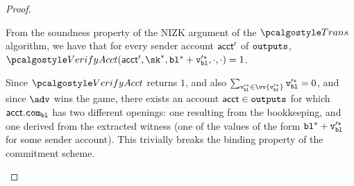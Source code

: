 \begin{proof}
\begin{itemize}
    From the soundness property of the NIZK argument of the $\trans$ algorithm, we have that for every sender account $\textup{\textsf{acct}}^\prime$ of ${\textup{\texttt{outputs}}}$, $\veract(\acct^\prime, \sk^*, \varbl^* + \vbl^{\prime *}, \cdot, \cdot)=1$.

    Since $\veract$ returns $1$, and also $\sum_{\vbl^{\prime *} \in \vv{\vbl^{\prime *}}} \vbl^{\prime *} = 0$, and since $\adv$ wins the game, there exists an account $\textup{\textsf{acct}} \in {\textup{\texttt{outputs}}}$ for which $\textup{\textsf{acct}}.\texttt{com}_{\textup{\texttt{{bl}}}}$ has two different openings: one resulting from the bookkeeping, and one derived from the extracted witness (one of the values of the form $\textup{\texttt{{bl}}}^* + \textup{\texttt{{v}}}_{\textup{\texttt{{bl}}}}^{\prime *}$ for some sender account). This trivially breaks the binding property of the commitment scheme.
    
    
   \end{itemize}

\end{proof}